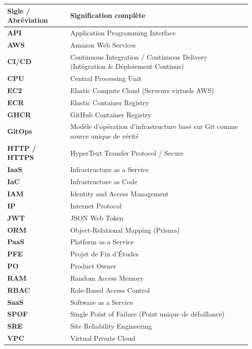 \documentclass[12pt,a4paper,oneside]{report}
\begin{document}
\begin{table}[H]
\centering
\begin{tabularx}{\textwidth}{l X}
\toprule
\textbf{Sigle / Abréviation} & \textbf{Signification complète} \\
\midrule
\textbf{API} & Application Programming Interface \\
\textbf{AWS} & Amazon Web Services \\
\textbf{CI/CD} & Continuous Integration / Continuous Delivery (Intégration \& Déploiement Continus) \\
\textbf{CPU} & Central Processing Unit \\
\textbf{EC2} & Elastic Compute Cloud (Serveurs virtuels AWS) \\
\textbf{ECR} & Elastic Container Registry \\
\textbf{GHCR} & GitHub Container Registry \\
\textbf{GitOps} & Modèle d'opération d'infrastructure basé sur Git comme source unique de vérité \\
\textbf{HTTP / HTTPS} & HyperText Transfer Protocol / Secure \\
\textbf{IaaS} & Infrastructure as a Service \\
\textbf{IaC} & Infrastructure as Code \\
\textbf{IAM} & Identity and Access Management \\
\textbf{IP} & Internet Protocol \\
\textbf{JWT} & JSON Web Token \\
\textbf{ORM} & Object-Relational Mapping (Prisma) \\
\textbf{PaaS} & Platform as a Service \\
\textbf{PFE} & Projet de Fin d'Études \\
\textbf{PO} & Product Owner \\
\textbf{RAM} & Random Access Memory \\
\textbf{RBAC} & Role-Based Access Control \\
\textbf{SaaS} & Software as a Service \\
\textbf{SPOF} & Single Point of Failure (Point unique de défaillance) \\
\textbf{SRE} & Site Reliability Engineering \\
\textbf{VPC} & Virtual Private Cloud \\
\bottomrule
\end{tabularx}
\end{table}

\clearpage
\end{document}
